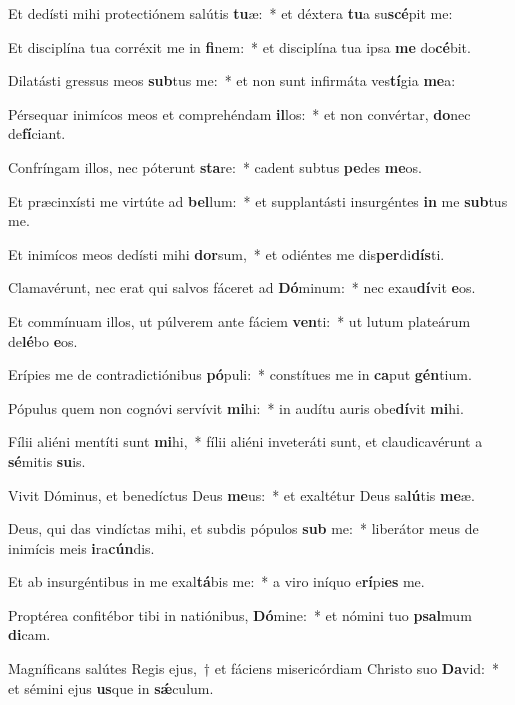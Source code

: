 \item Et dedísti mihi protectiónem salútis \textbf{tu}æ:~* et déxtera \textbf{tu}a su\textbf{scé}pit me:
\item Et disciplína tua corréxit me in \textbf{fi}nem:~* et disciplína tua ipsa \textbf{me} do\textbf{cé}bit.
\item Dilatásti gressus meos \textbf{sub}tus me:~* et non sunt infirmáta ves\textbf{tí}gia \textbf{me}a:
\item Pérsequar inimícos meos et comprehéndam \textbf{il}los:~* et non convértar, \textbf{do}nec de\textbf{fí}ciant.
\item Confríngam illos, nec póterunt \textbf{sta}re:~* cadent subtus \textbf{pe}des \textbf{me}os.
\item Et præcinxísti me virtúte ad \textbf{bel}lum:~* et supplantásti insurgéntes \textbf{in} me \textbf{sub}tus me.
\item Et inimícos meos dedísti mihi \textbf{dor}sum,~* et odiéntes me dis\textbf{per}di\textbf{dís}ti.
\item Clamavérunt, nec erat qui salvos fáceret ad \textbf{Dó}minum:~* nec exau\textbf{dí}vit \textbf{e}os.
\item Et commínuam illos, ut púlverem ante fáciem \textbf{ven}ti:~* ut lutum plateárum de\textbf{lé}bo \textbf{e}os.
\item Erípies me de contradictiónibus \textbf{pó}puli:~* constítues me in \textbf{ca}put \textbf{gén}tium.
\item Pópulus quem non cognóvi servívit \textbf{mi}hi:~* in audítu auris obe\textbf{dí}vit \textbf{mi}hi.
\item Fílii aliéni mentíti sunt \textbf{mi}hi,~* fílii aliéni inveteráti sunt, et claudicavérunt a \textbf{sé}mitis \textbf{su}is.
\item Vivit Dóminus, et benedíctus Deus \textbf{me}us:~* et exaltétur Deus sa\textbf{lú}tis \textbf{me}æ.
\item Deus, qui das vindíctas mihi, et subdis pópulos \textbf{sub} me:~* liberátor meus de inimícis meis \textbf{i}ra\textbf{cún}dis.
\item Et ab insurgéntibus in me exal\textbf{tá}bis me:~* a viro iníquo e\textbf{rí}pi\textbf{es} me.
\item Proptérea confitébor tibi in natiónibus, \textbf{Dó}mine:~* et nómini tuo \textbf{psal}mum \textbf{di}cam.
\item Magníficans salútes Regis ejus,~† et fáciens misericórdiam Christo suo \textbf{Da}vid:~* et sémini ejus \textbf{us}que in \textbf{sǽ}culum.
